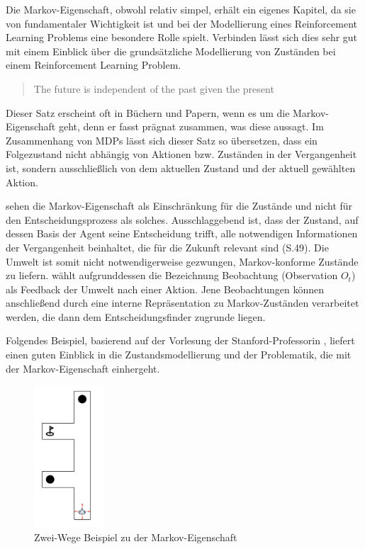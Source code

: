 Die Markov-Eigenschaft, obwohl relativ simpel, erhält ein eigenes Kapitel, da sie von fundamentaler Wichtigkeit ist und bei der Modellierung eines Reinforcement Learning Problems eine besondere Rolle spielt. Verbinden lässt sich dies sehr gut mit einem Einblick über die grundsätzliche Modellierung von Zuständen bei einem Reinforcement Learning Problem.

\begin{quote}
    The future is independent of the past given the present
  \end{quote}

Dieser Satz erscheint oft in Büchern und Papern, wenn es um die Markov-Eigenschaft geht, denn er fasst prägnat zusammen, was diese aussagt. Im Zusammenhang von MDPs lässt sich dieser Satz so übersetzen, dass ein Folgezustand nicht abhängig von Aktionen bzw. Zuständen in der Vergangenheit ist, sondern ausschließlich von dem aktuellen Zustand und der aktuell gewählten Aktion.
\par 
\cite{Sutton1998} sehen die Markov-Eigenschaft als Einschränkung für die Zustände und nicht für den Entscheidungsprozess als solches. 
Ausschlaggebend ist, dass der Zustand, auf dessen Basis der Agent seine Entscheidung trifft, alle notwendigen Informationen der Vergangenheit beinhaltet, die für die Zukunft relevant sind (S.49).
Die Umwelt ist somit nicht notwendigerweise gezwungen, Markov-konforme Zustände zu liefern. \cite{Brunskill} wählt aufgrunddessen die Bezeichnung \glqq Beobachtung\grqq{} (Observation $O_t$) als Feedback der Umwelt nach einer Aktion. Jene Beobachtungen können anschließend durch eine interne Repräsentation zu Markov-Zuständen verarbeitet werden, die dann dem Entscheidungsfinder zugrunde liegen.
\par
Folgendes Beispiel, basierend auf der Vorlesung der Stanford-Professorin \cite{Brunskill}, liefert einen guten Einblick in die Zustandsmodellierung und der Problematik, die mit der Markov-Eigenschaft einhergeht.
\par 
\begin{figure}[H]
  \centering
  \includegraphics[height=200px]{images/2passagesDefault.png}
  \caption{ Zwei-Wege Beispiel zu der Markov-Eigenschaft}
  \label{fig:2-Wege-1}
\end{figure}

